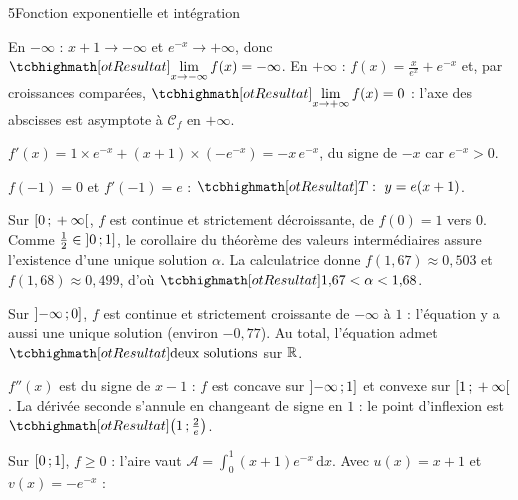\begin{corrigeBac}{5}{Fonction exponentielle et intégration}
\begin{questions}
  \item En $-\infty$ : $x+1\to-\infty$ et $e^{-x}\to+\infty$, donc $\res{\lim\limits_{x\to-\infty}f(x)=-\infty}$. En $+\infty$ :
    $f(x)=\frac{x}{e^{x}}+e^{-x}$ et, par croissances comparées, $\res{\lim\limits_{x\to+\infty}f(x)=0}$ : l'axe des abscisses est
    asymptote à $\mathcal{C}_f$ en $+\infty$. \pts{1 pt}
  \item $f'(x)=1\times e^{-x}+(x+1)\times\left(-e^{-x}\right)=-x\,e^{-x}$, du signe de $-x$ car $e^{-x}>0$.
\begin{center}
\begin{tableau}
\end{tableau}
\end{center}
    \pts{1 pt}
  \item $f(-1)=0$ et $f'(-1)=e$ : $\res{T:\ y=e(x+1)}$. 
\end{questions}
\begin{questions}[resume]
  \item Sur $\mathopen{[}0\,{;}\,+\infty\mathclose{[}$, $f$ est continue et strictement décroissante, de $f(0)=1$ vers $0$. Comme $\frac12\in\mathopen{]}0\,{;}\,1\mathclose{]}$, le
    corollaire du théorème des valeurs intermédiaires assure l'existence d'une unique solution $\alpha$. La calculatrice donne
    $f(1{,}67)\approx0{,}503$ et $f(1{,}68)\approx0{,}499$, d'où $\res{1{,}67<\alpha<1{,}68}$. 
  \item Sur $\mathopen{]}-\infty\,{;}\,0\mathclose{]}$, $f$ est continue et strictement croissante de $-\infty$ à $1$ : l'équation y a aussi une unique solution
    (environ $-0{,}77$). Au total, l'équation admet $\res{\text{deux solutions}}$ sur $\mathbb{R}$. 
\end{questions}
\begin{questions}[resume]
  \item $f''(x)$ est du signe de $x-1$ : $f$ est concave sur $\mathopen{]}-\infty\,{;}\,1\mathclose{]}$ et convexe sur $\mathopen{[}1\,{;}\,+\infty\mathclose{[}$. La dérivée seconde
    s'annule en changeant de signe en $1$ : le point d'inflexion est $\res{\left(1\pv\tfrac2e\right)}$. 
  \item Sur $\mathopen{[}0\,{;}\,1\mathclose{]}$, $f\geq0$ : l'aire vaut $\mathcal{A}=\int_0^1(x+1)e^{-x}\,\mathrm{d}x$. Avec $u(x)=x+1$ et $v(x)=-e^{-x}$ :

\end{questions}
\end{corrigeBac}
